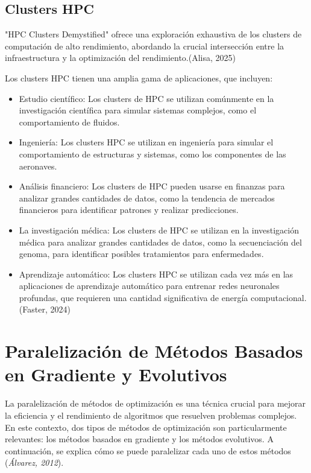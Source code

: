 	\subsection{Clusters HPC}
	
	"HPC Clusters Demystified" ofrece una exploración exhaustiva de los clusters de computación de alto rendimiento, abordando la crucial intersección entre la infraestructura y la optimización del rendimiento.(Alisa, 2025) 
	
	Los clusters HPC tienen una amplia gama de aplicaciones, que incluyen:
	
	\begin{itemize}
		\item Estudio científico: Los clusters de HPC se utilizan comúnmente en la investigación científica para simular sistemas complejos, como el comportamiento de fluidos.
		\item Ingeniería: Los clusters HPC se utilizan en ingeniería para simular el comportamiento de estructuras y sistemas, como los componentes de las aeronaves.
		\item Análisis financiero: Los clusters de HPC pueden usarse en finanzas para analizar grandes cantidades de datos, como la tendencia de mercados financieros para identificar patrones y realizar predicciones.
		\item La investigación médica: Los clusters de HPC se utilizan en la investigación médica para analizar grandes cantidades de datos, como la secuenciación del genoma, para identificar posibles tratamientos para enfermedades.
		\item Aprendizaje automático: Los clusters HPC se utilizan cada vez más en las aplicaciones de aprendizaje automático para entrenar redes neuronales profundas, que requieren una cantidad significativa de energía computacional.(Faster, 2024) 
	\end{itemize}
	
	\section{Paralelización de Métodos Basados en Gradiente y Evolutivos}
	
	La paralelización de métodos de optimización es una técnica crucial para mejorar la eficiencia y el rendimiento de algoritmos que resuelven problemas complejos. En este contexto, dos tipos de métodos de optimización son particularmente relevantes: los métodos basados en gradiente y los métodos evolutivos. A continuación, se explica cómo se puede paralelizar cada uno de estos métodos (\textit{Álvarez, 2012}).
	
